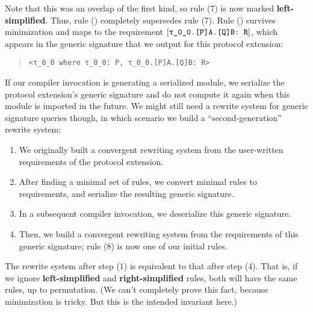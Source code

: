 \documentclass[../generics]{subfiles}
\begin{document}
\begin{example}
\begin{center}
\end{center}
Note that this was an overlap of the first kind, so rule (7) is now marked \textbf{left-simplified}. Thus, rule () completely supersedes rule (7). Rule () survives minimization and maps to the requirement $\ConfReq{\rT.[P]A.[Q]B}{R}$, which appears in the generic signature that we output for this protocol extension:
\begin{quote}
\begin{verbatim}
<τ_0_0 where τ_0_0: P, τ_0_0.[P]A.[Q]B: R>
\end{verbatim}
\end{quote}

If our compiler invocation is generating a serialized module, we serialize the protocol extension's generic signature and do not compute it again when this module is imported in the future. We might still need a rewrite system for generic signature queries though, in which scenario we build a ``second-generation'' rewrite system:
\begin{enumerate}
\item We originally built a convergent rewriting system from the user-written requirements of the protocol extension.
\item After finding a minimal set of rules, we convert minimal rules to requirements, and serialize the resulting generic signature.
\item In a subsequent compiler invocation, we deserialize this generic signature.
\item Then, we build a convergent rewriting system from the requirements of this generic signature; rule (8) is now one of our initial rules.
\end{enumerate}

The rewrite system after step (1) is equivalent to that after step (4). That is, if we ignore \textbf{left-simplified} and \textbf{right-simplified} rules, both will have the same rules, up to permutation. (We can't completely prove this fact, because minimization is tricky. But this is the intended invariant here.)
\end{example}
\end{document}
